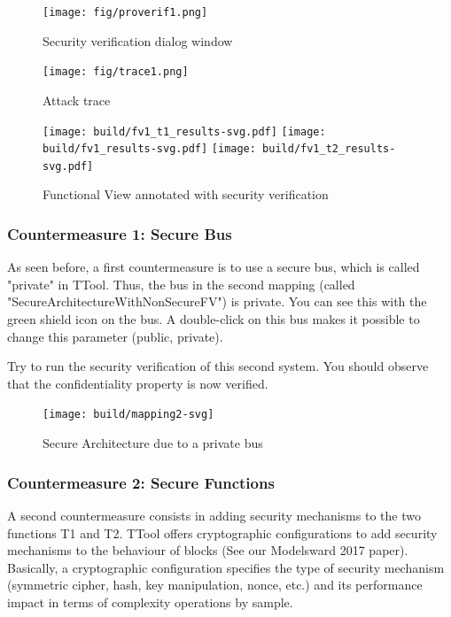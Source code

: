\documentclass[12pt]{article}
\begin{document}
\begin{figure}[htbp]
\centering
\texttt{[image: fig/proverif1.png]}
\caption{Security verification dialog window} \label{fig:proverif1}
\end{figure}


\begin{figure}[htbp]
\centering
\texttt{[image: fig/trace1.png]}
\caption{Attack trace} \label{fig:trace1}
\end{figure}

\begin{figure}[htbp]
\centering
\texttt{[image: build/fv1\_t1\_results-svg.pdf]}
\texttt{[image: build/fv1\_results-svg.pdf]}
\texttt{[image: build/fv1\_t2\_results-svg.pdf]}
\caption{Functional View annotated with security verification} \label{fig:fv1results}
\end{figure}

\subsubsection{Countermeasure 1: Secure Bus}
As seen before, a first countermeasure is to use a secure bus, which is called "private" in TTool. Thus, the bus in the second mapping (called "SecureArchitectureWithNonSecureFV") is private. You can see this with the green shield icon on the bus. A double-click on this bus makes it possible to change this parameter (public, private).

Try to run the security verification of this second system. You should observe that the confidentiality property is now verified.

\begin{figure}[htbp]
\centering
\texttt{[image: build/mapping2-svg]}
\caption{Secure Architecture due to a private bus} \label{fig:mapping2}
\end{figure}

\subsubsection{Countermeasure 2: Secure Functions}
A second countermeasure consists in adding security mechanisms to the two functions T1 and T2. TTool offers cryptographic configurations to add security mechanisms to the behaviour of blocks (See our Modelsward 2017 paper). Basically, a cryptographic configuration specifies the type of security mechanism (symmetric cipher, hash, key manipulation, nonce, etc.) and its performance impact in terms of complexity operations by sample.
\end{document}
